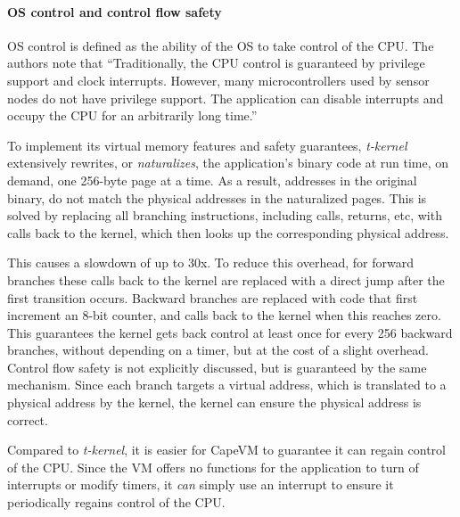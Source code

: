\paragraph{OS control and control flow safety}
OS control is defined as the ability of the OS to take control of the CPU. The authors note that “Traditionally, the CPU control is guaranteed by privilege support and clock interrupts. However, many microcontrollers used by sensor nodes do not have privilege support. The application can disable interrupts and occupy the CPU for an arbitrarily long time.”

To implement its virtual memory features and safety guarantees, \emph{t-kernel} extensively rewrites, or \emph{naturalizes}, the application's binary code at run time, on demand, one 256-byte page at a time. As a result, addresses in the original binary, do not match the physical addresses in the naturalized pages. This is solved by replacing all branching instructions, including calls, returns, etc, with calls back to the kernel, which then looks up the corresponding physical address.

This causes a slowdown of up to 30x. To reduce this overhead, for forward branches these calls back to the kernel are replaced with a direct jump after the first transition occurs. Backward branches are replaced with code that first increment an 8-bit counter, and calls back to the kernel when this reaches zero. This guarantees the kernel gets back control at least once for every 256 backward branches, without depending on a timer, but at the cost of a slight overhead. Control flow safety is not explicitly discussed, but is guaranteed by the same mechanism. Since each branch targets a virtual address, which is translated to a physical address by the kernel, the kernel can ensure the physical address is correct.

Compared to \emph{t-kernel}, it is easier for CapeVM to guarantee it can regain control of the CPU. Since the VM offers no functions for the application to turn of interrupts or modify timers, it \emph{can} simply use an interrupt to ensure it periodically regains control of the CPU.


